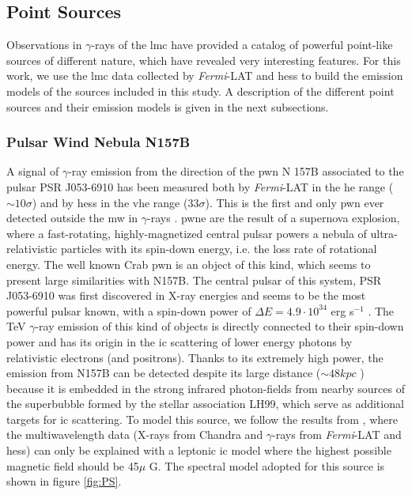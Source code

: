 \documentclass[main.tex]{subfiles}
\begin{document}
\subsection{Point Sources}\label{sec:point}

Observations in $\gamma$-rays of the \gls{lmc} have provided a catalog of powerful point-like sources of different nature, which have revealed very interesting features. For this work, we use the \gls{lmc} data collected by \textit{Fermi}-LAT \cite{2010FermiLATLMC11months} \cite{2016LMCFermiLAT} and \gls{hess} \cite{2012HESSLMC} \cite{2015HESSTeVLMC} \cite{2017HESSLMCP3} to build the emission models of the sources included in this study. A description of the different point sources and their emission models is given in the next subsections.

\subsubsection{Pulsar Wind Nebula N157B}

A signal of $\gamma$-ray emission from the direction of the \gls{pwn} N 157B associated to the pulsar  PSR J053-6910 has been measured both by \textit{Fermi}-LAT in the \gls{he} range ($\sim 10 \sigma$) and by \gls{hess} in the \gls{vhe} range ($33 \sigma$). This is the first and only \gls{pwn} ever detected outside the \gls{mw} in $\gamma$-rays \cite{2012HESSN157B}. \gls{pwne} are the result of a supernova explosion, where a fast-rotating, highly-magnetized central pulsar powers a nebula of ultra-relativistic particles with its spin-down energy, i.e. the loss rate of rotational energy. The well known Crab \gls{pwn} is an object of this kind, which seems to present large similarities with N157B. The central pulsar of this system, PSR J053-6910 was first discovered in X-ray energies and seems to be the most powerful pulsar known, with a spin-down power of $\Delta E = 4.9 \cdot 10^{34} $ erg s$^{-1}$ \cite{1998PulsarN157B}. The TeV $\gamma$-ray emission of this kind of objects is directly connected to their spin-down power and has its origin in the \gls{ic} scattering of lower energy photons by relativistic electrons (and positrons). Thanks to its extremely high power, the emission from N157B can be detected despite its large distance ($\sim 48 kpc$ \cite{2006N157Bdistance}) because it is embedded in the strong infrared photon-fields from nearby sources of the superbubble formed by the stellar association LH99, which serve as additional targets for \gls{ic} scattering.
To model this source, we follow the results from \cite{2015HESSTeVLMC}, where the multiwavelength data (X-rays from Chandra \cite{2001ChandraN157B} and $\gamma$-rays from \textit{Fermi}-LAT and \gls{hess}) can only be explained with a leptonic \gls{ic} model where the highest possible magnetic field should be 45$\mu$ G. The  spectral model adopted for this source is shown in figure \ref{fig:PS}.
\end{document}
